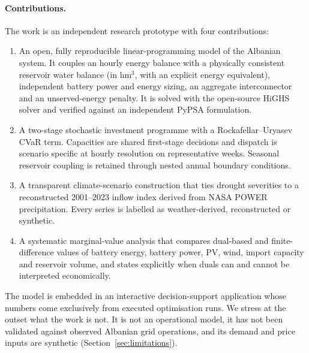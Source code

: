 \paragraph{Contributions.} The work is an independent research prototype with four contributions:
\begin{enumerate}
\item An open, fully reproducible linear-programming model of the Albanian system. It couples an hourly
energy balance with a physically consistent reservoir water balance (in hm$^3$, with an explicit energy
equivalent), independent battery power and energy sizing, an aggregate interconnector and an unserved-energy
penalty. It is solved with the open-source HiGHS solver and verified against an independent PyPSA formulation.
\item A two-stage stochastic investment programme with a Rockafellar--Uryasev CVaR term. Capacities are
shared first-stage decisions and dispatch is scenario specific at hourly resolution on representative weeks.
Seasonal reservoir coupling is retained through nested annual boundary conditions.
\item A transparent climate-scenario construction that ties drought severities to a reconstructed
2001--2023 inflow index derived from NASA POWER precipitation. Every series is labelled as weather-derived,
reconstructed or synthetic.
\item A systematic marginal-value analysis that compares dual-based and finite-difference values of
battery energy, battery power, PV, wind, import capacity and reservoir volume, and states explicitly when
duals can and cannot be interpreted economically.
\end{enumerate}
The model is embedded in an interactive decision-support application whose numbers come exclusively from
executed optimisation runs. We stress at the outset what the work is not. It is not an operational model,
it has not been validated against observed Albanian grid operations, and its demand and price inputs are
synthetic (Section~\ref{sec:limitations}).
